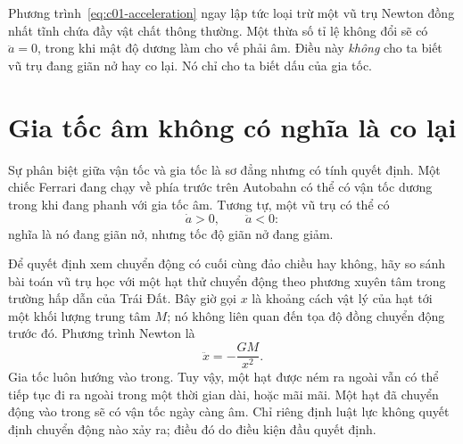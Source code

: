 \begin{classroomqa}
\end{classroomqa}

\begin{classroomqa}
\end{classroomqa}

Phương trình~\eqref{eq:c01-acceleration} ngay lập tức loại trừ một vũ trụ Newton đồng nhất tĩnh chứa đầy vật chất thông thường. Một thừa số tỉ lệ không đổi sẽ có \(\ddot a=0\), trong khi mật độ dương làm cho vế phải âm. Điều này \emph{không} cho ta biết vũ trụ đang giãn nở hay co lại. Nó chỉ cho ta biết dấu của gia tốc.

\section{Gia tốc âm không có nghĩa là co lại}

Sự phân biệt giữa vận tốc và gia tốc là sơ đẳng nhưng có tính quyết định. Một chiếc Ferrari đang chạy về phía trước trên Autobahn có thể có vận tốc dương trong khi đang phanh với gia tốc âm. Tương tự, một vũ trụ có thể có
\begin{equation}
\dot a>0,
\qquad
\ddot a<0:
\end{equation}
nghĩa là nó đang giãn nở, nhưng tốc độ giãn nở đang giảm.

Để quyết định xem chuyển động có cuối cùng đảo chiều hay không, hãy so sánh bài toán vũ trụ học với một hạt thử chuyển động theo phương xuyên tâm trong trường hấp dẫn của Trái Đất. Bây giờ gọi \(x\) là khoảng cách vật lý của hạt tới một khối lượng trung tâm \(M\); nó không liên quan đến tọa độ đồng chuyển động trước đó. Phương trình Newton là
\begin{equation}
\ddot x=-\frac{GM}{x^2}.
\label{eq:c01-particle-force}
\end{equation}
Gia tốc luôn hướng vào trong. Tuy vậy, một hạt được ném ra ngoài vẫn có thể tiếp tục đi ra ngoài trong một thời gian dài, hoặc mãi mãi. Một hạt đã chuyển động vào trong sẽ có vận tốc ngày càng âm. Chỉ riêng định luật lực không quyết định chuyển động nào xảy ra; điều đó do điều kiện đầu quyết định.

